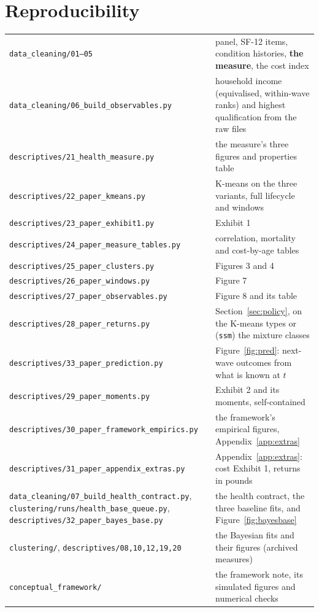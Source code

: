 \documentclass[11pt]{article}
\newcommand{\code}[1]{\texttt{\small #1}}
\begin{document}
\section{Reproducibility}
\begin{center}\small
\begin{tabular}{@{}>{\raggedright\arraybackslash}p{6.3cm}>{\raggedright\arraybackslash}p{8.6cm}@{}}
\toprule
\code{data\_cleaning/01--05} & panel, SF-12 items, condition histories, \textbf{the measure}, the cost index \\
\code{data\_cleaning/06\_build\_observables.py} & household income (equivalised, within-wave ranks) and highest qualification from the raw files \\
\code{descriptives/21\_health\_measure.py} & the measure's three figures and properties table \\
\code{descriptives/22\_paper\_kmeans.py} & K-means on the three variants, full lifecycle and windows \\
\code{descriptives/23\_paper\_exhibit1.py} & Exhibit 1 \\
\code{descriptives/24\_paper\_measure\_tables.py} & correlation, mortality and cost-by-age tables \\
\code{descriptives/25\_paper\_clusters.py} & Figures 3 and 4 \\
\code{descriptives/26\_paper\_windows.py} & Figure 7 \\
\code{descriptives/27\_paper\_observables.py} & Figure 8 and its table \\
\code{descriptives/28\_paper\_returns.py} & Section~\ref{sec:policy}, on the K-means types or (\code{ssm}) the mixture classes \\
\code{descriptives/33\_paper\_prediction.py} & Figure~\ref{fig:pred}: next-wave outcomes from what is known at $t$ \\
\code{descriptives/29\_paper\_moments.py} & Exhibit 2 and its moments, self-contained \\
\code{descriptives/30\_paper\_framework\_empirics.py} & the framework's empirical figures, Appendix~\ref{app:extras} \\
\code{descriptives/31\_paper\_appendix\_extras.py} & Appendix~\ref{app:extras}: cost Exhibit 1, returns in pounds \\
\code{data\_cleaning/07\_build\_health\_contract.py}, \code{clustering/runs/health\_base\_queue.py}, \code{descriptives/32\_paper\_bayes\_base.py} & the health contract, the three baseline fits, and Figure~\ref{fig:bayesbase} \\
\code{clustering/}, \code{descriptives/08,10,12,19,20} & the Bayesian fits and their figures (archived measures) \\
\code{conceptual\_framework/} & the framework note, its simulated figures and numerical checks \\
\bottomrule
\end{tabular}
\end{center}
\end{document}
